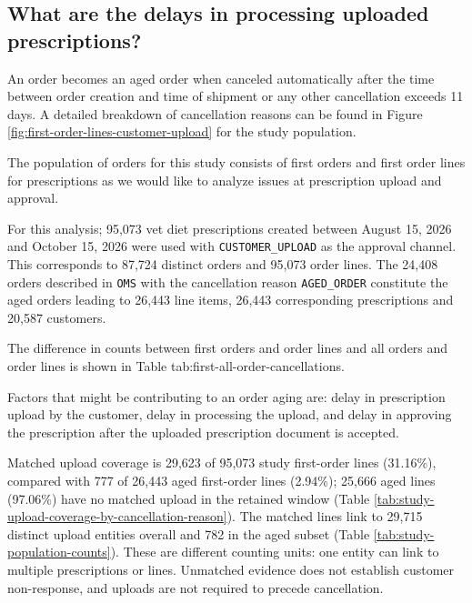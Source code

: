 \clearpage
\nolinenumbers
\subsection{What are the delays in processing uploaded prescriptions?}\label{app:aged-order-analysis}
An order becomes an aged order when canceled automatically after the
time between order creation and time of shipment or any other
cancellation exceeds 11 days. A detailed breakdown of cancellation
reasons can be found in Figure \ref{fig:first-order-lines-customer-upload}
for the study population.

The population of orders for this study consists of first orders and
first order lines for prescriptions as we would like to analyze issues at
prescription upload and approval.

For this analysis; 95,073 vet diet prescriptions created between
August 15, 2026 and October 15, 2026 were used with
\verb|CUSTOMER_UPLOAD| as the approval channel. This corresponds to
87,724 distinct orders and 95,073 order lines. The 24,408 orders
described in \verb|OMS| with the cancellation reason
\verb|AGED_ORDER| constitute the  aged orders leading to 26,443 line
items, 26,443 corresponding prescriptions and 20,587 customers.

The difference in counts between first orders and order lines and all
orders and order lines is shown in Table
{tab:first-all-order-cancellations}.


Factors that might be contributing to an order aging are: delay in
prescription upload by the customer, delay in processing the upload,
and delay in approving the prescription after the uploaded
prescription document is accepted.

Matched upload coverage is 29,623 of 95,073 study first-order lines
(31.16\%), compared with 777 of 26,443 aged first-order lines (2.94\%);
25,666 aged lines (97.06\%) have no matched upload in the retained window
(Table \ref{tab:study-upload-coverage-by-cancellation-reason}).
The matched lines link to 29,715 distinct upload entities overall and
782 in the aged subset (Table \ref{tab:study-population-counts}).
These are different counting units: one entity can link to multiple
prescriptions or lines. Unmatched evidence does not establish customer
non-response, and uploads are not required to precede cancellation.

